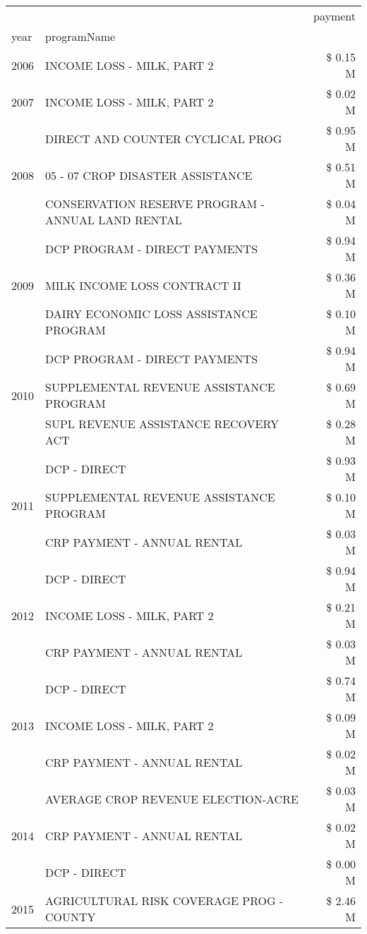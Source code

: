 \begin{tabular}{llr}
\toprule
 &  & payment \\
year & programName &  \\
\midrule
2006 & INCOME LOSS - MILK, PART 2 & \$ 0.15 M \\
\cline{1-3}
2007 & INCOME LOSS - MILK, PART 2 & \$ 0.02 M \\
\cline{1-3}
\multirow[t]{3}{*}{2008} & DIRECT AND COUNTER CYCLICAL PROG & \$ 0.95 M \\
 & 05 - 07 CROP DISASTER ASSISTANCE & \$ 0.51 M \\
 & CONSERVATION RESERVE PROGRAM - ANNUAL LAND RENTAL & \$ 0.04 M \\
\cline{1-3}
\multirow[t]{3}{*}{2009} & DCP PROGRAM - DIRECT PAYMENTS & \$ 0.94 M \\
 & MILK INCOME LOSS CONTRACT II & \$ 0.36 M \\
 & DAIRY ECONOMIC LOSS ASSISTANCE PROGRAM & \$ 0.10 M \\
\cline{1-3}
\multirow[t]{3}{*}{2010} & DCP PROGRAM - DIRECT PAYMENTS & \$ 0.94 M \\
 & SUPPLEMENTAL REVENUE ASSISTANCE PROGRAM & \$ 0.69 M \\
 & SUPL REVENUE ASSISTANCE RECOVERY ACT & \$ 0.28 M \\
\cline{1-3}
\multirow[t]{3}{*}{2011} & DCP - DIRECT & \$ 0.93 M \\
 & SUPPLEMENTAL REVENUE ASSISTANCE PROGRAM & \$ 0.10 M \\
 & CRP PAYMENT - ANNUAL RENTAL & \$ 0.03 M \\
\cline{1-3}
\multirow[t]{3}{*}{2012} & DCP - DIRECT & \$ 0.94 M \\
 & INCOME LOSS - MILK, PART 2 & \$ 0.21 M \\
 & CRP PAYMENT - ANNUAL RENTAL & \$ 0.03 M \\
\cline{1-3}
\multirow[t]{3}{*}{2013} & DCP - DIRECT & \$ 0.74 M \\
 & INCOME LOSS - MILK, PART 2 & \$ 0.09 M \\
 & CRP PAYMENT - ANNUAL RENTAL & \$ 0.02 M \\
\cline{1-3}
\multirow[t]{3}{*}{2014} & AVERAGE CROP REVENUE ELECTION-ACRE & \$ 0.03 M \\
 & CRP PAYMENT - ANNUAL RENTAL & \$ 0.02 M \\
 & DCP - DIRECT & \$ 0.00 M \\
\cline{1-3}
\multirow[t]{3}{*}{2015} & AGRICULTURAL RISK COVERAGE PROG - COUNTY & \$ 2.46 M \\

\end{tabular}

